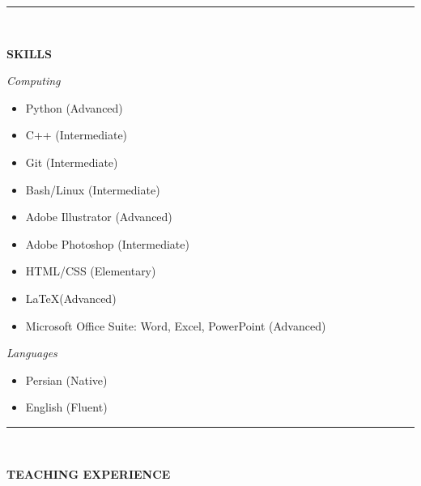 \documentclass[12pt, b4paper]{cv}
\begin{document}
\vspace{-0.15in}
\rule{\textwidth}{1pt}\\
\vspace{-0.15in}


{\Large \textbf{SKILLS}}
\vspace{5pt}

\textit{Computing}

\begin{multicols}{3}[]
	\begin{itemize}
	\setlength\itemsep{-0.5pt}
	  \item  Python (Advanced)
	  \item  C++ (Intermediate)
	  \item  Git (Intermediate)
	  \item  Bash/Linux (Intermediate)
	  \item  Adobe Illustrator (Advanced)
	  \item  Adobe Photoshop (Intermediate)
	  \item  HTML/CSS (Elementary)
	  \item  \LaTeX  (Advanced)
	  \item  Microsoft Office Suite: Word, Excel, PowerPoint (Advanced)
	\end{itemize}
\end{multicols}

\textit{Languages}

\begin{multicols}{3}[]
	\begin{itemize}
	\setlength\itemsep{-1pt}
	  \item  Persian (Native)
	  \item  English (Fluent)
	\end{itemize}
\end{multicols}

\pagebreak
\vspace{-0.15in}
\rule{\textwidth}{1pt}\\
\vspace{-0.15in}

{\Large \textbf{TEACHING EXPERIENCE}}
\vspace{0.1in}
\end{document}
